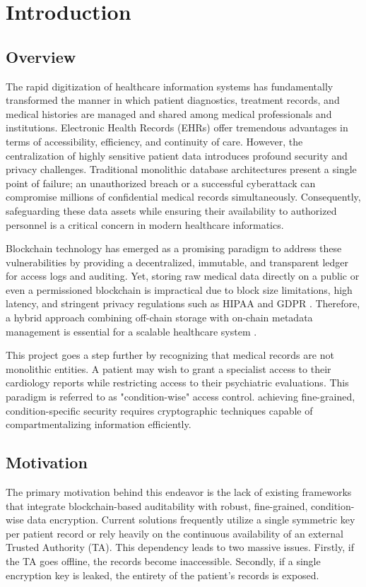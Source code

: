 \chapter{Introduction}

\section{Overview}
The rapid digitization of healthcare information systems has fundamentally transformed the manner in which patient diagnostics, treatment records, and medical histories are managed and shared among medical professionals and institutions. Electronic Health Records (EHRs) offer tremendous advantages in terms of accessibility, efficiency, and continuity of care. However, the centralization of highly sensitive patient data introduces profound security and privacy challenges. Traditional monolithic database architectures present a single point of failure; an unauthorized breach or a successful cyberattack can compromise millions of confidential medical records simultaneously. Consequently, safeguarding these data assets while ensuring their availability to authorized personnel is a critical concern in modern healthcare informatics. 

Blockchain technology has emerged as a promising paradigm to address these vulnerabilities by providing a decentralized, immutable, and transparent ledger for access logs and auditing. Yet, storing raw medical data directly on a public or even a permissioned blockchain is impractical due to block size limitations, high latency, and stringent privacy regulations such as HIPAA and GDPR \cite{zhang2021security, shorfuzzaman2021blockchain}. Therefore, a hybrid approach combining off-chain storage with on-chain metadata management is essential for a scalable healthcare system \cite{sharma2025hybrid, rahman2019secure}. 

This project goes a step further by recognizing that medical records are not monolithic entities. A patient may wish to grant a specialist access to their cardiology reports while restricting access to their psychiatric evaluations. This paradigm is referred to as "condition-wise" access control. achieving fine-grained, condition-specific security requires cryptographic techniques capable of compartmentalizing information efficiently.

\section{Motivation}
The primary motivation behind this endeavor is the lack of existing frameworks that integrate blockchain-based auditability with robust, fine-grained, condition-wise data encryption. Current solutions frequently utilize a single symmetric key per patient record or rely heavily on the continuous availability of an external Trusted Authority (TA). This dependency leads to two massive issues. Firstly, if the TA goes offline, the records become inaccessible. Secondly, if a single encryption key is leaked, the entirety of the patient's records is exposed. 

